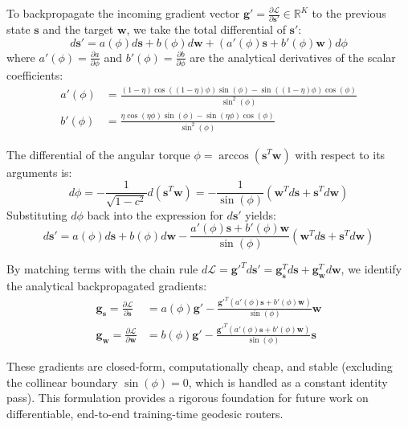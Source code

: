 \documentclass{article}
\theoremstyle{plain}
\theoremstyle{definition}
\theoremstyle{remark}
\begin{document}
To backpropagate the incoming gradient vector $\mathbf{g}' = \frac{\partial \mathcal{L}}{\partial \mathbf{s}'} \in \mathbb{R}^K$ to the previous state $\mathbf{s}$ and the target $\mathbf{w}$, we take the total differential of $\mathbf{s}'$:
\begin{equation}
d\mathbf{s}' = a(\phi) d\mathbf{s} + b(\phi) d\mathbf{w} + \left( a'(\phi) \mathbf{s} + b'(\phi) \mathbf{w} \right) d\phi
\end{equation}
where $a'(\phi) = \frac{\partial a}{\partial \phi}$ and $b'(\phi) = \frac{\partial b}{\partial \phi}$ are the analytical derivatives of the scalar coefficients:
\begin{align}
a'(\phi) &= \frac{(1-\eta)\cos((1-\eta)\phi)\sin(\phi) - \sin((1-\eta)\phi)\cos(\phi)}{\sin^2(\phi)} \\
b'(\phi) &= \frac{\eta\cos(\eta\phi)\sin(\phi) - \sin(\eta\phi)\cos(\phi)}{\sin^2(\phi)}
\end{align}

The differential of the angular torque $\phi = \arccos(\mathbf{s}^T \mathbf{w})$ with respect to its arguments is:
\begin{equation}
d\phi = -\frac{1}{\sqrt{1 - c^2}} d( \mathbf{s}^T \mathbf{w} ) = -\frac{1}{\sin(\phi)} \left( \mathbf{w}^T d\mathbf{s} + \mathbf{s}^T d\mathbf{w} \right)
\end{equation}
Substituting $d\phi$ back into the expression for $d\mathbf{s}'$ yields:
\begin{equation}
d\mathbf{s}' = a(\phi) d\mathbf{s} + b(\phi) d\mathbf{w} - \frac{ a'(\phi)\mathbf{s} + b'(\phi)\mathbf{w} }{\sin(\phi)} \left( \mathbf{w}^T d\mathbf{s} + \mathbf{s}^T d\mathbf{w} \right)
\end{equation}

By matching terms with the chain rule $d\mathcal{L} = \mathbf{g}'^T d\mathbf{s}' = \mathbf{g}_{\mathbf{s}}^T d\mathbf{s} + \mathbf{g}_{\mathbf{w}}^T d\mathbf{w}$, we identify the analytical backpropagated gradients:
\begin{align}
\mathbf{g}_{\mathbf{s}} = \frac{\partial \mathcal{L}}{\partial \mathbf{s}} &= a(\phi) \mathbf{g}' - \frac{\mathbf{g}'^T (a'(\phi)\mathbf{s} + b'(\phi)\mathbf{w})}{\sin(\phi)} \mathbf{w} \\
\mathbf{g}_{\mathbf{w}} = \frac{\partial \mathcal{L}}{\partial \mathbf{w}} &= b(\phi) \mathbf{g}' - \frac{\mathbf{g}'^T (a'(\phi)\mathbf{s} + b'(\phi)\mathbf{w})}{\sin(\phi)} \mathbf{s}
\end{align}

These gradients are closed-form, computationally cheap, and stable (excluding the collinear boundary $\sin(\phi) = 0$, which is handled as a constant identity pass). This formulation provides a rigorous foundation for future work on differentiable, end-to-end training-time geodesic routers.
\end{document}
